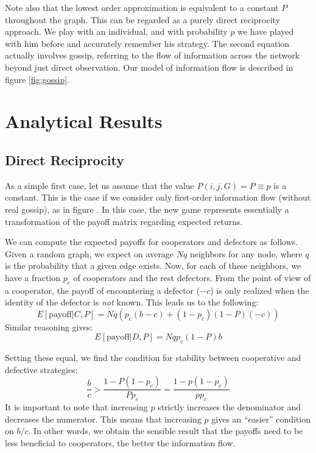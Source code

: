 \documentclass{article}
\renewcommand{\=}[1]{\stackrel{#1}{=}} %
\begin{document}
 Note also that the lowest order approximation is equivalent to a
constant $P$ throughout the graph. This can be regarded as a purely direct reciprocity approach.
We play with an individual, and with probability $p$ we have played with
him before and accurately remember his strategy. The second equation
actually involves gossip, referring to the flow of information across
the network beyond just direct observation. Our model of information flow is described in figure \ref{fig:gossip}.

\section{Analytical Results}
\subsection{Direct Reciprocity}
As a simple first case, let us assume that the value
$P(i,j,G) = P \equiv p$ is a constant. This is the case if we consider only first-order information flow (without real gossip), as in figure \protect{}. In this case, the new game
represents essentially a transformation of the payoff matrix regarding
expected returns.

We can compute the expected payoffs for cooperators and defectors as
follows. Given a random graph, we expect on average $N q$
neighbors for any node, where $q$ is the probability that a given edge exists.
Now, for each of these neighbors, we have a fraction $p_c$ of
cooperators and the rest defectors. From the point of view of a cooperator, the payoff of encountering a
defector ($-c$) is only realized when the identity of the defector is
\emph{not} known. This leads us to the following:
\[E[\text{payoff}|C,P] = N q \left(p_c (b - c) + (1 - p_c) (1 - P) (-c)\right)\]
Similar reasoning gives:
\[E[\text{payoff}|D,P] = N q p_c(1- P) b\]

Setting these equal, we find the condition for stability between
cooperative and defective strategies:
\begin{equation}\label{eq:bc_threshold}
\frac{b}{c} > \frac{1 - P(1- p_c)}{Pp_c} = \frac{1 - p (1- p_c)}{p p_c}
\end{equation}
It is important to note that increasing $p$ strictly increases the denominator and decreases the numerator. This means that increasing $p$ gives an ``easier'' condition on $b/c$. In other words, we obtain the sensible result that the payoffs need to be less beneficial to cooperators, the better the information flow.
\end{document}
